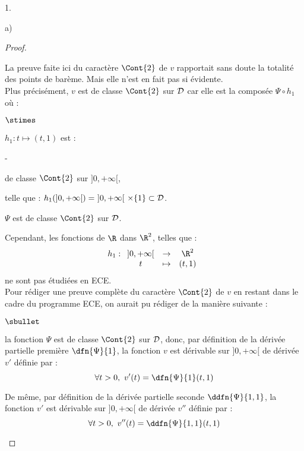 \documentclass[11pt]{article}%
\begin{document}
\begin{noliste}{1.}
\begin{noliste}{a)}
\begin{proof}
   
   
   
   
   \newpage
   
   
   
   
   \begin{remark}
    La preuve faite ici du caractère $\Cont{2}$ de $v$ rapportait sans 
    doute la totalité des points de barème.
    Mais elle n'est en fait pas si évidente.\\
    Plus précisément, $v$ est de classe $\Cont{2}$ sur 
    ${\cal D}$ car elle est la composée $\Psi \circ h_1$ où :
    \begin{noliste}{$\stimes$}
      \item $h_1:t \mapsto (t,1)$ est :
      \begin{noliste}{-}
      \item de classe $\Cont{2}$ sur $]0,+\infty[$,
      \item telle que : $h_1(]0,+\infty[) = \ ]0,+\infty[ \ \times \{1\}
      \subset {\cal D}$.
      \end{noliste}
      \item $\Psi$ est de classe $\Cont{2}$ sur ${\cal D}$.
    \end{noliste}
    Cependant, les fonctions de $\R$ dans $\R^2$, telles que :
    \[
    h_1:
    \begin{array}[t]{ccc}
     ]0,+\infty[ & \to & \R^2\\
     t & \mapsto & (t,1)
    \end{array}
    \]
    ne sont pas étudiées en ECE.\\
    Pour rédiger une preuve complète du caractère $\Cont{2}$ de $v$
    en restant dans le cadre du programme ECE, on aurait pu rédiger de 
    la manière suivante :
    \begin{noliste}{$\sbullet$}
      \item la fonction $\Psi$ est de classe $\Cont{2}$ sur ${\cal D}$,
      donc, par définition de la dérivée partielle première 
      $\dfn{\Psi}{1}$, la fonction $v$ est dérivable sur $]0,+\infty[$
      de dérivée $v'$ définie par :
      \[
       \forall t>0, \ v'(t) = \dfn{\Psi}{1}(t,1)
      \]
      
      \item De même, par définition de la dérivée partielle 
      seconde $\ddfn{\Psi}{1,1}$, la fonction $v'$ est dérivable
      sur $]0,+\infty[$ de dérivée $v''$ définie par :
      \[
       \forall t>0, \ v''(t) = \ddfn{\Psi}{1,1}(t,1)
      \]
      

\end{noliste}
\end{remark}
\end{proof}
\end{noliste}
\end{noliste}
\end{document}
